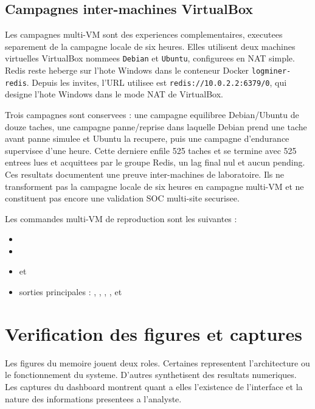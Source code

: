 \subsection{Campagnes inter-machines VirtualBox}
Les campagnes multi-VM sont des experiences complementaires, executees separement de la campagne locale de six heures. Elles utilisent deux machines virtuelles VirtualBox nommees \texttt{Debian} et \texttt{Ubuntu}, configurees en NAT simple. Redis reste heberge sur l'hote Windows dans le conteneur Docker \texttt{logminer-redis}. Depuis les invites, l'URL utilisee est \texttt{redis://10.0.2.2:6379/0}, qui designe l'hote Windows dans le mode NAT de VirtualBox.

Trois campagnes sont conservees : une campagne equilibree Debian/Ubuntu de douze taches, une campagne panne/reprise dans laquelle Debian prend une tache avant panne simulee et Ubuntu la recupere, puis une campagne d'endurance supervisee d'une heure. Cette derniere enfile 525 taches et se termine avec 525 entrees lues et acquittees par le groupe Redis, un lag final nul et aucun pending. Ces resultats documentent une preuve inter-machines de laboratoire. Ils ne transforment pas la campagne locale de six heures en campagne multi-VM et ne constituent pas encore une validation SOC multi-site securisee.

Les commandes multi-VM de reproduction sont les suivantes :

\begin{itemize}
  \item {}
  \item {}
  \item {} et 
  \item sorties principales : , , , ,  et 
\end{itemize}

\section{Verification des figures et captures}
Les figures du memoire jouent deux roles. Certaines representent l'architecture ou le fonctionnement du systeme. D'autres synthetisent des resultats numeriques. Les captures du dashboard montrent quant a elles l'existence de l'interface et la nature des informations presentees a l'analyste.


